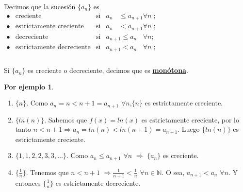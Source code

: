 \documentclass{article}
\theoremstyle{definition}
\newtheorem*{ej}{Por ejemplo}
\theoremstyle{remark}
\begin{document}
\begin{defi}
  Decimos que la sucesión $\{a_n\}$ es \\
  $\begin{array}{lcll}
    \bullet & \text{creciente}& \text{si} & a_{n\phantom{+1}} \leq a_{n+1} \forall n \; ; \\

    \bullet & \text{estríctamente creciente} & \text{si} & a_{n\phantom{+1}} < a_{n+1} \forall n \; ; \\
    \bullet &  \text{decreciente} & \text{si} & a_{n+1} \leq a_{n\phantom{+1}}\forall n ; \\ 
    \bullet & \text{estríctamente decreciente} & \text{si} & a_{n+1} < a_{n\phantom{+1}} \forall n \; ; \\

  \end{array}$ \\\\
  Si $\{a_{n}\}$ es creciente o decreciente, decimos que es \textbf{\underline{monótona}}.

\end{defi}

\begin{ej}
  \begin{enumerate} \; \\

    \item $\{n\}$. Como $a_n=n<n+1=a_{n+1}$ $\forall n$,$\{n\}$ es estrictamente creciente.
    \item $\{ln(n)\}$. Sabemos que $f(x)=ln(x)$ es estrictamente creciente, por lo tanto $n<n+1 \Rightarrow a_n=ln(n)<ln(n+1)=a_{n+1}$. Luego $\{ln(n)\}$ es estrictamente creciente. 
       \item $\{1,1,2,2,3,3,\dots\}$. Como $a_n \leq a_{n+1}$ $\forall n $ $ \Rightarrow $ $\{a_n\}$ es creciente.
    \item $\{\frac{1}{n}\}$. Tenemos que $n<{n+1}$ $\Rightarrow \frac{1}{n+1} < \frac{1}{n}$ $\forall n \in \mathbb{N}$. O sea, $a_{n+1}<a_n$ $\forall n$. Y entonces $\{\frac{1}{n}\}$ es estrictamente decreciente.

  \end{enumerate}
\end{ej} 
\end{document}
